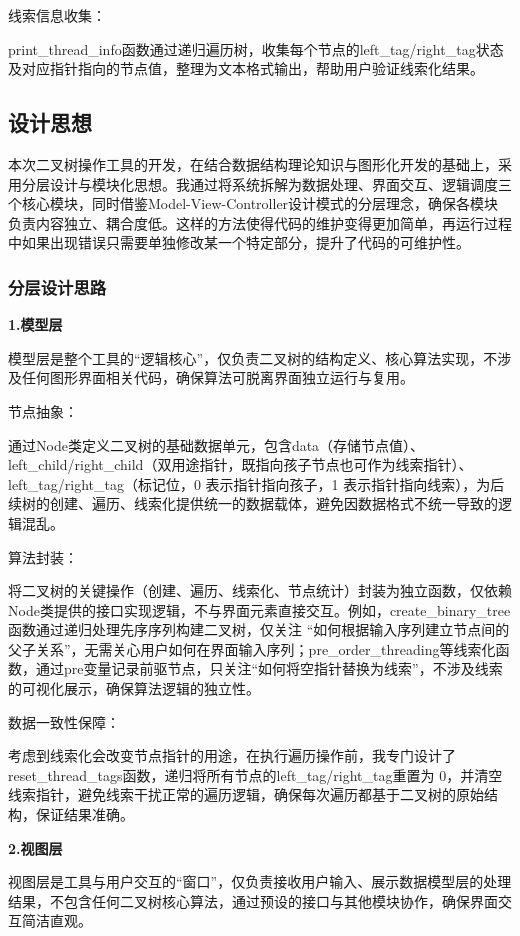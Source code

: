\documentclass[12pt,a4paper]{article}
\begin{document}
线索信息收集：

print\_thread\_info函数通过递归遍历树，收集每个节点的left\_tag/right\_tag状态及对应指针指向的节点值，整理为文本格式输出，帮助用户验证线索化结果。

\subsection{设计思想}

本次二叉树操作工具的开发，在结合数据结构理论知识与图形化开发的基础上，采用分层设计与模块化思想。我通过将系统拆解为数据处理、界面交互、逻辑调度三个核心模块，同时借鉴Model-View-Controller设计模式的分层理念，确保各模块负责内容独立、耦合度低。这样的方法使得代码的维护变得更加简单，再运行过程中如果出现错误只需要单独修改某一个特定部分，提升了代码的可维护性。
\subsubsection {分层设计思路}

\noindent\textbf {1.模型层}

模型层是整个工具的“逻辑核心”，仅负责二叉树的结构定义、核心算法实现，不涉及任何图形界面相关代码，确保算法可脱离界面独立运行与复用。

节点抽象：

通过Node类定义二叉树的基础数据单元，包含data（存储节点值）、left\_child/right\_child（双用途指针，既指向孩子节点也可作为线索指针）、left\_tag/right\_tag（标记位，0 表示指针指向孩子，1 表示指针指向线索），为后续树的创建、遍历、线索化提供统一的数据载体，避免因数据格式不统一导致的逻辑混乱。

算法封装：

将二叉树的关键操作（创建、遍历、线索化、节点统计）封装为独立函数，仅依赖Node类提供的接口实现逻辑，不与界面元素直接交互。例如，create\_binary\_tree函数通过递归处理先序序列构建二叉树，仅关注 “如何根据输入序列建立节点间的父子关系”，无需关心用户如何在界面输入序列；pre\_order\_threading等线索化函数，通过pre变量记录前驱节点，只关注“如何将空指针替换为线索”，不涉及线索的可视化展示，确保算法逻辑的独立性。

数据一致性保障：

考虑到线索化会改变节点指针的用途，在执行遍历操作前，我专门设计了reset\_thread\_tags函数，递归将所有节点的left\_tag/right\_tag重置为 0，并清空线索指针，避免线索干扰正常的遍历逻辑，确保每次遍历都基于二叉树的原始结构，保证结果准确。

\noindent\textbf {2.视图层}

视图层是工具与用户交互的“窗口”，仅负责接收用户输入、展示数据模型层的处理结果，不包含任何二叉树核心算法，通过预设的接口与其他模块协作，确保界面交互简洁直观。
\end{document}
